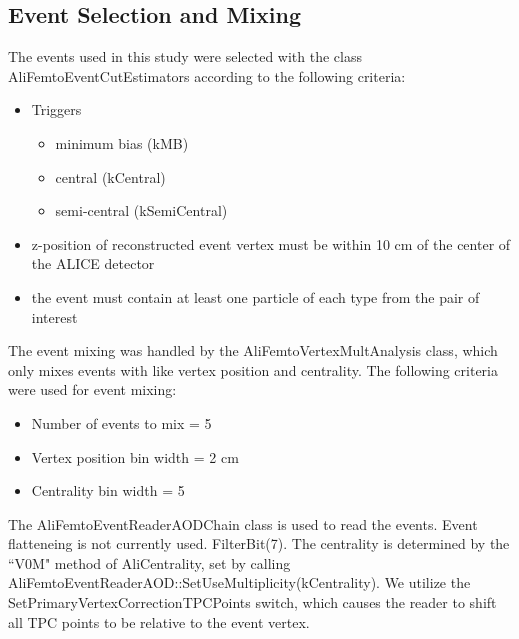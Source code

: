 \documentclass[../AnalysisNoteJBuxton.tex]{subfiles}
\begin{document}
\subsection{Event Selection and Mixing}
\label{EventSelection}

The events used in this study were selected with the class AliFemtoEventCutEstimators according to the following criteria:

\begin{itemize}
 \itemsep0em
 \item Triggers
 \begin{itemize}
  \itemsep0em
  \item minimum bias (kMB)
  \item central (kCentral)
  \item semi-central (kSemiCentral)
 \end{itemize}
 \item z-position of reconstructed event vertex must be within 10 cm of the center of the ALICE detector
 \item the event must contain at least one particle of each type from the pair of interest
\end{itemize}

The event mixing was handled by the AliFemtoVertexMultAnalysis class, which only mixes events with like vertex position and centrality.
The following criteria were used for event mixing:

\begin{itemize}
 \itemsep0em
 \item Number of events to mix = 5
 \item Vertex position bin width = 2 cm
 \item Centrality bin width = 5%
\end{itemize}

The AliFemtoEventReaderAODChain class is used to read the events.
Event flatteneing is not currently used.
FilterBit(7).
The centrality is determined by the ``V0M" method of AliCentrality, set by calling AliFemtoEventReaderAOD::SetUseMultiplicity(kCentrality).
We utilize the SetPrimaryVertexCorrectionTPCPoints switch, which causes the reader to shift all TPC points to be relative to the event vertex.
\end{document}
